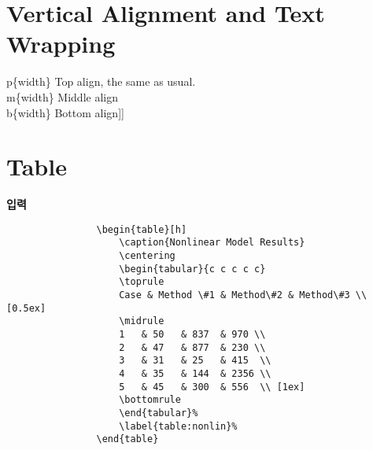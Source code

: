 \documentclass[12pt,a4paper]{report}
\begin{document}
\newpage  
\section{Vertical Alignment and Text Wrapping}
\null


			p\{width\} Top align, the same as usual.\\
			m\{width\} Middle align\\
			b\{width\} Bottom align]]
























\newpage  
\section{Table}
\null

	\textbf{입력}
		\begin{minipage}[t]{0.5\textwidth}
		\singlespacing
		\begin{verbatim}
				\begin{table}[h]
					\caption{Nonlinear Model Results}
					\centering
					\begin{tabular}{c c c c c}
					\toprule
					Case & Method \#1 & Method\#2 & Method\#3 \\ [0.5ex]
					\midrule
					1   & 50   & 837  & 970 \\
					2   & 47   & 877  & 230 \\
					3   & 31   & 25   & 415  \\
					4   & 35   & 144  & 2356 \\
					5   & 45   & 300  & 556  \\ [1ex]
					\bottomrule
					\end{tabular}%
					\label{table:nonlin}%
				\end{table}
		\end{verbatim}
		\end{minipage}\\
\end{document}
